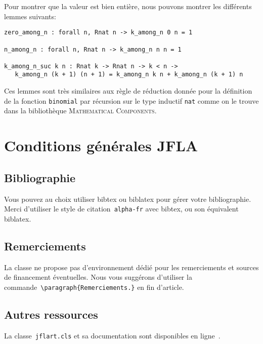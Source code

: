 \documentclass[draft]{jflart}
\newcommand{\cmd}[1]{\texttt{\textbackslash {#1}}}
\newcommand{\mathcomp}{\textsc{Mathematical Components}}
\begin{document}
Pour montrer que la valeur est bien entière, nous pouvons montrer les
différents lemmes suivants:
\begin{verbatim}
zero_among_n : forall n, Rnat n -> k_among_n 0 n = 1

n_among_n : forall n, Rnat n -> k_among_n n n = 1

k_among_n_suc k n : Rnat k -> Rnat n -> k < n ->
   k_among_n (k + 1) (n + 1) = k_among_n k n + k_among_n (k + 1) n
\end{verbatim}
Ces lemmes sont très similaires aux règle de réduction donnée pour
la définition de la fonction \texttt{binomial} par récursion sur le type
inductif \texttt{nat} comme on le trouve dans la bibliothèque
\mathcomp{}.

\section{Conditions générales JFLA}

\subsection{Bibliographie}

Vous pouvez au choix utiliser bibtex ou biblatex pour gérer votre bibliographie.
%
Merci d'utiliser le style de citation~\texttt{alpha-fr} avec bibtex, ou son
équivalent biblatex.

\subsection{Remerciements}

La classe ne propose pas d'environnement dédié pour les remerciements et sources de financement éventuelles.
%
Nous vous suggérons d'utiliser la commande~\cmd{paragraph\{Remerciements.\}} en
fin d'article.

\subsection{Autres ressources}

La classe~\texttt{jflart.cls} et sa documentation sont disponibles en
ligne~\cite{JFLART}.



\end{document}
